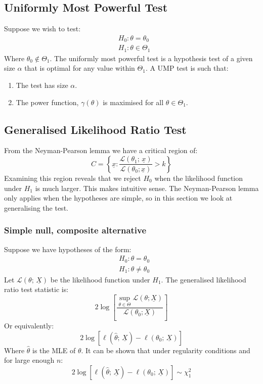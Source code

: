 \documentclass[12pt]{article}
\begin{document}
\subsection{Uniformly Most Powerful Test}
Suppose we wish to test:
\begin{align*}
    &H_0:\theta=\theta_0 \\
    &H_1:\theta\in\Theta_1
\end{align*}
Where \(\theta_0\notin\Theta_1\). The uniformly most powerful test is a hypothesis test of a given size \(\alpha\) that is optimal for any value within \(\Theta_1\). A UMP test is such that:
\begin{enumerate}
    \item The test has size \(\alpha\).
    \item The power function, \(\gamma(\theta)\) is maximised for all \(\theta\in \Theta_1\).
\end{enumerate}
\subsection{Generalised Likelihood Ratio Test}
From the Neyman-Pearson lemma we have a critical region of:
\[C=\left\{\underline{x}:\frac{\mathcal{L}(\theta_1;\,\underline{x})}{\mathcal{L}(\theta_0;\underline{x})}>k\right\}\]
Examining this region reveals that we reject \(H_0\) when the likelihood function under \(H_1\) is much larger. This makes intuitive sense. The Neyman-Pearson lemma only applies when the hypotheses are simple, so in this section we look at generalising the test.
\subsubsection{Simple null, composite alternative}
Suppose we have hypotheses of the form:
\begin{align*}
    &H_0:\theta=\theta_0 \\
    &H_1:\theta\ne\theta_0
\end{align*}
Let \(\mathcal{L}(\theta;\,\underline{X})\) be the likelihood function under \(H_1\). The generalised likelihood ratio test statistic is:
\[2\log\left[\frac{\sup_{\theta\in\Theta}\mathcal{L}(\theta;\underline{X})}{\mathcal{L}(\theta_0;\underline{X})}\right]\]
Or equivalently:
\[2\log[\ell(\hat{\theta};\,\underline{X})-\ell(\theta_0;\,\underline{X})]\]
Where \(\hat{\theta}\) is the MLE of \(\theta\). It can be shown that under regularity conditions and for large enough \(n\):
\[2\log[\ell(\hat{\theta};\,\underline{X})-\ell(\theta_0;\,\underline{X})]\sim\chi^2_1\]
\end{document}
